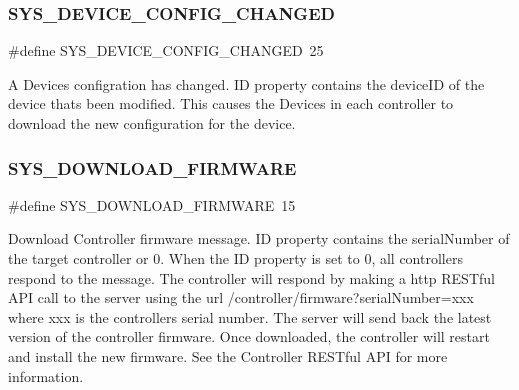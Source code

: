 \subsubsection{\texorpdfstring{S\+Y\+S\+\_\+\+D\+E\+V\+I\+C\+E\+\_\+\+C\+O\+N\+F\+I\+G\+\_\+\+C\+H\+A\+N\+G\+ED}{SYS\_DEVICE\_CONFIG\_CHANGED}}
{\footnotesize\ttfamily \#define S\+Y\+S\+\_\+\+D\+E\+V\+I\+C\+E\+\_\+\+C\+O\+N\+F\+I\+G\+\_\+\+C\+H\+A\+N\+G\+ED~25}

A Device\textquotesingle{}s configration has changed. ID property contains the device\+ID of the device that\textquotesingle{}s been modified. This causes the Devices in each controller to download the new configuration for the device. \mbox{\label{group___u_d_p_message_i_d_ga88b6f619a28320e9136847e9b1b27a36}} 
\subsubsection{\texorpdfstring{S\+Y\+S\+\_\+\+D\+O\+W\+N\+L\+O\+A\+D\+\_\+\+F\+I\+R\+M\+W\+A\+RE}{SYS\_DOWNLOAD\_FIRMWARE}}
{\footnotesize\ttfamily \#define S\+Y\+S\+\_\+\+D\+O\+W\+N\+L\+O\+A\+D\+\_\+\+F\+I\+R\+M\+W\+A\+RE~15}

Download Controller firmware message. ID property contains the serial\+Number of the target controller or 0. When the ID property is set to 0, all controllers respond to the message. The controller will respond by making a http R\+E\+S\+Tful A\+PI call to the server using the url /controller/firmware?serial\+Number=xxx where xxx is the controller\textquotesingle{}s serial number. The server will send back the latest version of the controller firmware. Once downloaded, the controller will restart and install the new firmware. See the Controller R\+E\+S\+Tful A\+PI for more information. \mbox{\label{group___u_d_p_message_i_d_gadfda0e5a5a6a08de555dd55182a4cd87}} 
